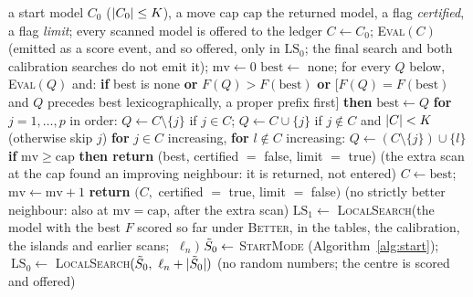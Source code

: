 \begin{algorithm}
\caption{Stage~6: the local search, certification, and the two searches of a run.}\label{alg:ls}
{\footnotesize
\begin{algorithmic}[1]
\Require a start model $C_0$ ($\lvert C_0\rvert\le K$), a move cap $\mathrm{cap}$
\Ensure the returned model, a flag \emph{certified}, a flag \emph{limit}; every scanned model is offered to the ledger
\State $C\gets C_0$; \textsc{Eval}$(C)$ (emitted as a score event, and so offered, only in $\mathrm{LS}_0$; the final search and both calibration searches do not emit it); $\mathrm{mv}\gets0$ %
\State $\mathrm{best}\gets$ none; for every $Q$ below, \textsc{Eval}$(Q)$ and: \textbf{if} best is none \textbf{or} $F(Q)>F(\mathrm{best})$ \textbf{or} [$F(Q)=F(\mathrm{best})$ and $Q$ precedes best lexicographically, a proper prefix first] \textbf{then} $\mathrm{best}\gets Q$ %
\State \textbf{for} $j=1,\dots,p$ in order: $Q\gets C\setminus\{j\}$ if $j\in C$; $Q\gets C\cup\{j\}$ if $j\notin C$ and $\lvert C\rvert<K$ (otherwise skip $j$) %
\State \textbf{for} $j\in C$ increasing, \textbf{for} $l\notin C$ increasing: $Q\gets(C\setminus\{j\})\cup\{l\}$ %
\State \textbf{if} $\mathrm{mv}\ge\mathrm{cap}$ \textbf{then return} (best, certified $=$ false, limit $=$ true) (the extra scan at the cap found an improving neighbour: it is returned, not entered) %
\State $C\gets\mathrm{best}$; $\mathrm{mv}\gets\mathrm{mv}+1$ %
\Else
\State \textbf{return} $(C,$ certified $=$ true, limit $=$ false$)$ (no strictly better neighbour: also at $\mathrm{mv}=\mathrm{cap}$, after the extra scan) %
\EndIf
\EndWhile
\EndProcedure
{}
\State $\mathrm{LS}_1\gets$ \textsc{LocalSearch}(the model with the best $F$ scored so far under \textsc{Better}, in the tables, the calibration, the islands and earlier scans; $\ \ell_n)$ %
\State $\tilde S_0\gets$ \textsc{StartMode} (Algorithm~\ref{alg:start}); $\ \mathrm{LS}_0\gets$ \textsc{LocalSearch}$(\tilde S_0,\ \ell_n+\lvert \tilde S_0\rvert)$ (no random numbers; the centre is scored and offered) %
\EndProcedure
\end{algorithmic}}
\end{algorithm}

